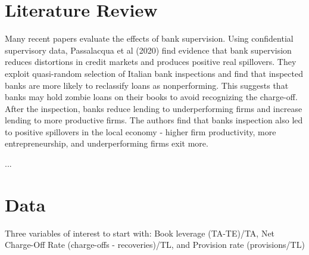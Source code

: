\documentclass{article}
\begin{document}
\section{Literature Review}

Many recent papers evaluate the effects of bank supervision.  Using confidential supervisory data, Passalacqua et al (2020) find evidence that bank supervision reduces distortions in credit markets and produces positive real spillovers.  They exploit quasi-random selection of Italian bank inspections and find that inspected banks are more likely to reclassify loans as nonperforming.  This suggests that banks may hold zombie loans on their books to avoid recognizing the charge-off.  After the inspection, banks reduce lending to underperforming firms and increase lending to more productive firms.  The authors find that banks inspection also led to positive spillovers in the local economy - higher firm productivity, more entrepreneurship, and underperforming firms exit more.

...

\section{Data}

Three variables of interest to start with: Book leverage (TA-TE)/TA, Net Charge-Off Rate (charge-offs - recoveries)/TL, and Provision rate (provisions/TL)
\end{document}
